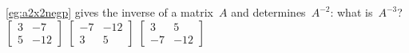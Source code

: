 \begin{activity}
\autoref{eg:a2x2negp} gives the inverse of a matrix~\(A\) and determines~\(A^{-2}\): what is~\(A^{-3}\)?
{\(\begin{bmatrix} 3&-7\\5&-12 \end{bmatrix}\)}
{\(\begin{bmatrix} -7&-12\\3&5 \end{bmatrix}\)}
{\(\begin{bmatrix} 3&5\\-7&-12 \end{bmatrix}\)}
\end{activity}




